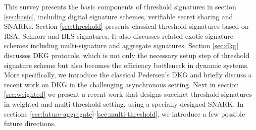 This survey presents the basic components of threshold signatures in section \ref{sec:basic}, including digital signature schemes, verifiable secret sharing and SNARKs. Section \ref{sec:threshold} presents classical threshold signatures based on RSA, Schnorr and BLS signatures. It also discusses related exotic signature schemes including multi-signature and aggregate signatures. Section \ref{sec:dkg} discusses DKG protocols, which is not only the necessary setup step of threshold signature scheme but also becomes the efficiency bottleneck in dynamic systems. More specifically, we introduce the classical Pedersen's DKG and briefly discuss a recent work on DKG in the challenging asynchronous setting. Next in section \ref{sec:weighted} we present a recent work that designs succinct threshold signatures in weighted and multi-threshold setting, using a specially designed SNARK. In sections \ref{sec:future-aggregate}-\ref{sec:multi-threshold}, we introduce a few possible future directions. 

